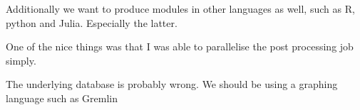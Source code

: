 \documentclass[runningheads]{llncs}
\begin{document}
Additionally we want to produce modules in other languages as well, such as R, python and Julia. Especially the latter. 

One of the nice things was that I was able to parallelise the post processing job simply.

The underlying database is probably wrong. We should be using a graphing language such as Gremlin 

%
%
%


% 
%
\end{document}
